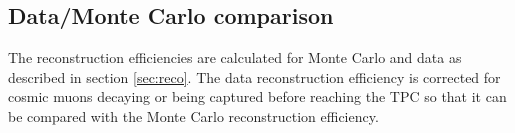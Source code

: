 \documentclass[a4paper,11pt]{article}
\begin{document}




\subsection{Data/Monte Carlo comparison}\label{sec:datamc}
The reconstruction efficiencies are calculated for Monte Carlo and data as described in section \ref{sec:reco}. The data reconstruction efficiency is corrected for cosmic muons decaying or being captured before reaching the TPC so that it can be compared with the Monte Carlo reconstruction efficiency.
\end{document}
